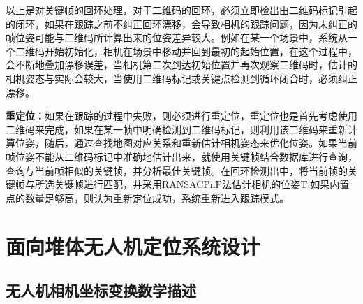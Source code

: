 以上是对关键帧的回环处理，对于二维码的回环，必须立即检出由二维码标记引起的闭环，如果在跟踪之前不纠正回环漂移，会导致相机的跟踪问题，因为未纠正的帧位姿可能与二维码所计算出来的位姿差异较大。例如在某一个场景中，系统从一个二维码开始初始化，相机在场景中移动并回到最初的起始位置，在这个过程中，会不断地叠加漂移误差，当相机第二次到达初始位置并再次观察二维码时，估计的相机姿态与实际会较大，当使用二维码标记或关键点检测到循环闭合时，必须纠正漂移。

\textbf{重定位：}如果在跟踪的过程中失败，则必须进行重定位，重定位也是首先考虑使用二维码来完成，如果在某一帧中明确检测到二维码标记，则利用该二维码来重新计算位姿，随后，通过查找地图对应关系和重新估计相机姿态来优化位姿。如果当前帧位姿不能从二维码标记中准确地估计出来，就使用关键帧结合数据库进行查询，查询与当前帧相似的关键帧，并分析最佳关键帧。在回环检测出中，将当前帧的关键帧与所选关键帧进行匹配，并采用RANSACPnP法估计相机的位姿T,如果内置点的数量足够高，则认为重新定位成功，系统重新进入跟踪模式。
\section{面向堆体无人机定位系统设计}
\label{sec:2.4}
\subsection{无人机相机坐标变换数学描述}
\label{sec:2.4.1}

